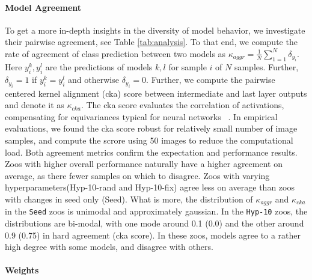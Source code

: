 \paragraph{Model Agreement}
To get a more in-depth insights in the diversity of model behavior, we investigate their pairwise agreement, see Table \ref{tab:analysis}. 
To that end, we compute the rate of agreement of class prediction between two models as $\kappa_{aggr} = \frac{1}{N}\sum_{1=1}^{N} \delta_{y_i}$. Here $y_i^k, y_i^l$ are the predictions of models $k,l$ for sample $i$ of $N$ samples. Further, $\delta_{y_i}=1$ if $y_i^k=y_i^l$ and otherwise $\delta_{y_i}=0$.
Further, we compute the pairwise centered kernel alignment (cka) score between intermediate and last layer outputs and denote it as $\kappa_{cka}$. The cka score evaluates the correlation of activations, compensating for equivariances typical for neural networks ~\citep{nguyenWideDeepNetworks2020}. 
In empirical evaluations, we found the cka score robust for relatively small number of image samples, and compute the scrore using 50 images to reduce the computational load. 
Both agreement metrics confirm the expectation and performance results. Zoos with higher overall performance naturally have a higher agreement on average, as there fewer samples on which to disagree. 
Zoos with varying hyperparameters(Hyp-10-rand and Hyp-10-fix) agree less on average than zoos with changes in seed only (Seed). What is more, the distribution of $\kappa_{aggr}$ and $\kappa_{cka}$ in the \texttt{Seed} zoos is unimodal and approximately gaussian. In the \texttt{Hyp-10} zoos, the distributions are bi-modal, with one mode around 0.1 (0.0) and the other around 0.9 (0.75) in hard agreement (cka score). In these zoos, models agree to a rather high degree with some models, and disagree with others. 

\paragraph{Weights}

